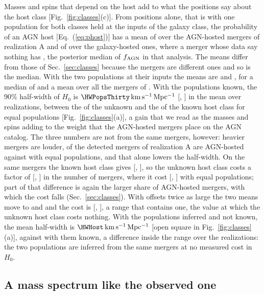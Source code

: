 \documentclass[aps,prd,reprint,twocolumn,superscriptaddress,nofootinbib,floatfix,nolongbibliography]{revtex4-2}
\newcommand{\kms}{{\rm km\,s^{-1}\,Mpc^{-1}}}
\newcommand{\fagn}{f_{\rm AGN}}
\begin{document}
Masses and spins that depend on the host add to what the positions say
about the host class [Fig.~\ref{fig:classes}(c)]. From positions alone, that
is with one population for both classes held at the inputs of the galaxy
class, the probability of an AGN host [Eq.~(\ref{eq:phost})] has a mean of
\ProbAGNPos{} over the AGN-hosted mergers of realization A and of
\ProbGalPos{} over the galaxy-hosted ones, where a merger whose data say
nothing has \ProbEvalfAGNPos, the posterior median of $\fagn$ in that
analysis. The means differ from those of Sec.~\ref{sec:classes} because the
mergers are different ones and so is the median. With the two populations at
their inputs the means are \ProbAGNPops{} and \ProbGalPops, for a median of
\ProbEvalfAGNPops{} and a mean over all the mergers of \ProbAllPops. With
the populations known, the
90\% half-width of $H_0$ is $\HWPopsThirty\,\kms$ [\HWPopsThirtyMin,
\HWPopsThirtyMax] in the mean over \NrealClasses{} realizations, between the
\HWUnknownThirty{} of the unknown and the \HWKnownThirty{} of the known host
class for equal populations [Fig.~\ref{fig:classes}(a)], a gain that we read
as the masses and spins adding to the weight that the AGN-hosted mergers
place on the AGN catalog. The three numbers are not from the same mergers,
however: heavier mergers are louder, \MockHDfDet{} of the detected mergers
of realization A are AGN-hosted against \MockfAGNRealised{} with equal
populations, and that alone lowers the half-width. On the same mergers the
known host class gives \HWKnownPopsThirty{} [\HWKnownPopsThirtyMin,
\HWKnownPopsThirtyMax], so the unknown host class costs a factor of
\CostPopsThirty{} [\CostPopsThirtyMin, \CostPopsThirtyMax] in the number of
mergers, where it cost \CostUnknownThirty{} [\CostUnknownThirtyMin,
\CostUnknownThirtyMax] with equal populations; part of that difference is
again the larger share of AGN-hosted mergers, with which the cost falls
(Sec.~\ref{sec:classes}).
With offsets twice as large the two means move to \ProbAGNPopsTwice{} and
\ProbGalPopsTwice{} and the cost is \CostPopsTwiceThirty{}
[\CostPopsTwiceThirtyMin, \CostPopsTwiceThirtyMax], a range that contains
one, the value at which the unknown host class costs nothing.
With the populations inferred and not known, the mean half-width is
$\HWHost\,\kms$ [open square in Fig.~\ref{fig:classes}(a)], against
\HWPopsThirty{} with them known, a difference inside the range over the
realizations: the two populations are inferred from the same mergers at no
measured cost in $H_0$.

\subsection{A mass spectrum like the observed one}
\label{sec:obs}
\end{document}
